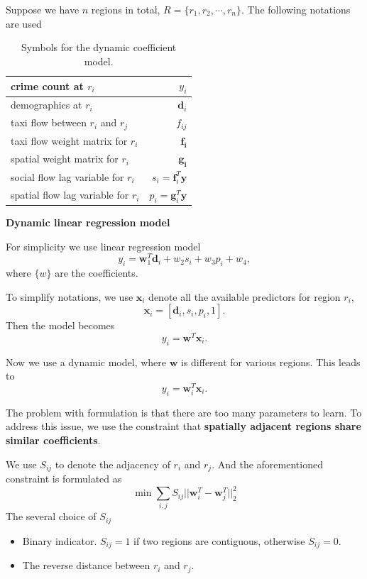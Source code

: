 Suppose we have $n$ regions in total, $R = \{ r_1, r_2, \cdots, r_n \}$.
The following notations are used

\begin{table}[h]
\centering
\begin{tabular}{|l|r|}
\hline
crime count at $r_i$ & $y_i$ \\ \hline
demographics at $r_i$ & $\mathbf{d}_i$ \\ \hline
taxi flow between $r_i$ and $r_j$ & $f_{ij}$ \\ \hline
taxi flow weight matrix for $r_i$ & $\mathbf{f_i}$ \\ \hline
spatial weight matrix for $r_i$ & $\mathbf{g_i}$ \\ \hline
social flow lag variable for $r_i$ & $s_i = \mathbf{f}_i^T \mathbf{y}$ \\\hline
spatial flow lag variable for $r_i$ & $p_i = \mathbf{g}_i^T \mathbf{y}$ \\\hline
\end{tabular}
\caption{Symbols for the dynamic coefficient model.}
\end{table}


\textbf{Dynamic linear regression model}



For simplicity we use linear regression model
\[
y_i = \mathbf{w}_1^T \mathbf{d}_i + w_2 s_i + w_3 p_i + w_4,
\]
where $\{ w \}$ are the coefficients.

To simplify notations, we use $\mathbf{x}_i$ denote all the available predictors for region $r_i$,
\[
\mathbf{x}_i = [ \mathbf{d}_i, s_i, p_i, 1 ].
\]
Then the model becomes 
\[
y_i = \mathbf{w}^T \mathbf{x}_i.
\]



Now we use a dynamic model, where $\mathbf{w}$ is different for various regions.
This leads to 
\[
y_i  = \mathbf{w}_i^T \mathbf{x}_i.
\]


The problem with formulation is that there are too many parameters to learn. To address this issue, we use the constraint that \textbf{spatially adjacent regions share similar coefficients}.

We use $S_{ij}$ to denote the adjacency of $r_i$ and $r_j$. And the aforementioned constraint is formulated as
\[
\min \sum_{i,j} S_{ij} ||\mathbf{w}_i^T - \mathbf{w}_j^T||_2^2
\] The several choice of $S_{ij}$
\begin{itemize}
\item Binary indicator. $S_{ij} = 1$ if two regions are contiguous, otherwise $S_{ij} = 0$.
\item The reverse distance between $r_i$ and $r_j$. 
\end{itemize}

